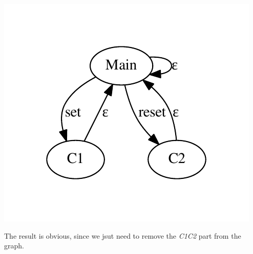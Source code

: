 \documentclass{article}
\begin{document}
\begin{center}
\includegraphics{asyn_strict.pdf}
\end{center}

The result is obvious, since we jsut need to remove the \emph{C1C2} part from
the graph.

\end{document}
